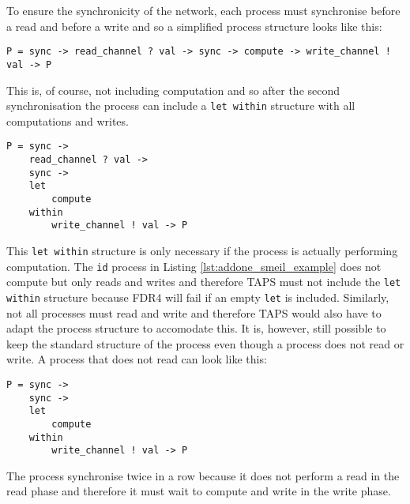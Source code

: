 To ensure the synchronicity of the network, each process must synchronise before a read and before a write and so a simplified process structure looks like this:
\begin{verbatim}
P = sync -> read_channel ? val -> sync -> compute -> write_channel ! val -> P
\end{verbatim}
This is, of course, not including computation and so after the second synchronisation the process can include a \texttt{let within} structure with all computations and writes.
\begin{verbatim}
P = sync ->
    read_channel ? val ->
    sync ->
    let
        compute
    within
        write_channel ! val -> P
\end{verbatim}
This \texttt{let within} structure is only necessary if the process is actually performing computation. The \texttt{id} process in Listing \ref{lst:addone_smeil_example} does not compute but only reads and writes and therefore TAPS must not include the \texttt{let within} structure because FDR4 will fail if an empty \texttt{let} is included. Similarly, not all processes must read and write and therefore TAPS would also have to adapt the process structure to accomodate this. It is, however, still possible to keep the standard structure of the process even though a process does not read or write. A process that does not read can look like this:
\begin{verbatim}
P = sync ->
    sync ->
    let
        compute
    within
        write_channel ! val -> P
\end{verbatim}
The process synchronise twice in a row because it does not perform a read in the read phase and therefore it must wait to compute and write in the write phase. \\

